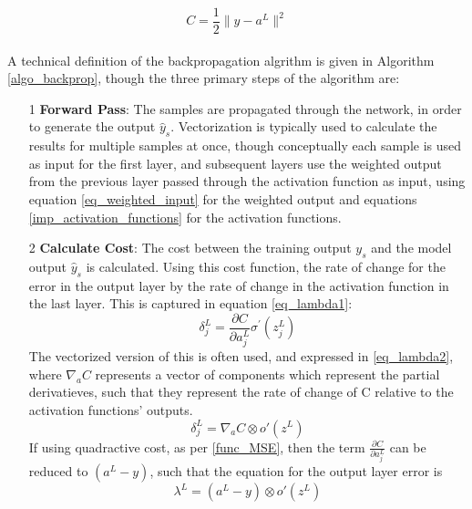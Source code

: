 \documentclass[a4paper,latin]{paper}
\begin{document}
\begin{equation}\label{func_MSE}
C = \frac{1}{2} \rVert y - a^L \rVert^2
\end{equation}
~\\

A technical definition of the backpropagation algrithm is given in Algorithm \ref{algo_backprop}, though the three primary steps of the algorithm are:\newline
\begin{itemize}
	\item [1] \textbf{Forward Pass}: The samples are propagated through the network, in order to generate the output $\hat{y}_s$. Vectorization is typically used to calculate the results for multiple samples at once, though conceptually each sample is used as input for the first layer, and subsequent layers use the weighted output from the previous layer passed through the activation function as input, using equation \eqref{eq_weighted_input} for the weighted output and equations \ref{imp_activation_functions} for the activation functions.
	
	\item [2] \textbf{Calculate Cost}: The cost between the training output $y_s$ and the model output $\hat{y}_s$ is calculated. Using this cost function, the rate of change for the error in the output layer by the rate of change in the activation function in the last layer. This is captured in equation \eqref{eq_lambda1}:	
		\begin{equation}\label{eq_lambda1}
		\delta_{j}^{L}=\frac{\partial C}{\partial a_{j}^{L}} \sigma^{\prime}\left(z_{j}^{L}\right)
		\end{equation}
	The vectorized version of this is often used, and expressed in \eqref{eq_lambda2}, where $\nabla_a C$ represents a vector of components which represent the partial derivatieves, such that they represent the rate of change of C relative to the activation functions' outputs.
		\begin{equation}\label{eq_lambda2}
		\delta_{j}^{L}=\nabla_a C \otimes o'(z^L)
		\end{equation}
	If using quadractive cost, as per \ref{func_MSE}, then the term $\frac{\partial C}{\partial a_{j}^{L}}$ can be reduced to $(a^L - y)$, such that the equation for the output layer error is
	\begin{equation}\label{eq_lambda3}
				\lambda^L = (a^L - y) \otimes o'(z^L)
	\end{equation}
		

\end{itemize}
\end{document}
